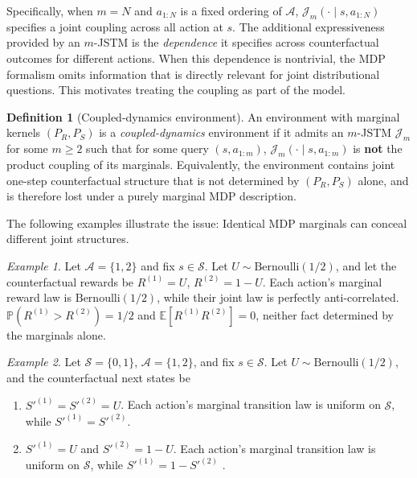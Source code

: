 \documentclass[accepted]{uai2026}
\theoremstyle{plain}
\theoremstyle{definition}
\newtheorem{definition}[theorem]{Definition}
\theoremstyle{remark}
\newtheorem{example}{Example}
\newcommand{\A}{\mathcal{A}}
\newcommand{\E}{\mathbb{E}}
\newcommand{\Ss}{\mathcal{S}}
\newcommand{\1}{\mathbbm{1}}
\begin{document}
Specifically, when $m =N$ and $a_{1:N}$ is a fixed ordering of $\A$, $\mathcal{J}_m(\cdot \mid s, a_{1:N})$ specifies a joint coupling across all action at $s$. The additional expressiveness provided by an $m$-JSTM is the \textit{dependence} it specifies across counterfactual outcomes for different actions. When this dependence is nontrivial, the MDP formalism omits information that is directly relevant for joint distributional questions. This motivates treating the coupling as part of the model.
\begin{definition}[Coupled-dynamics environment]
An environment with marginal kernels $(P_R, P_S)$ is a \textit{coupled-dynamics} environment if it admits an $m$-JSTM $\mathcal{J}_m$ for some $m \ge 2$ such that for some query $(s, a_{1:m})$, $\mathcal{J}_m(\cdot \mid s, a_{1:m})$ is \textbf{not} the product coupling of its marginals. Equivalently, the environment contains joint one-step counterfactual structure that is not determined by $(P_R, P_S)$ alone, and is therefore lost under a purely marginal MDP description.
\end{definition}

The following examples illustrate the issue: Identical MDP marginals can conceal different joint structures.
\begin{example}
Let $\A = \{1, 2\}$ and fix $s \in \Ss$. Let $U \sim \mathrm{Bernoulli}(1/2)$, and let the counterfactual rewards be $R^{(1)} = U$, $R^{(2)} = 1- U$. Each action's marginal reward law is $\mathrm{Bernoulli}(1/2)$, while their joint law is perfectly anti-correlated. $\mathbb{P}(R^{(1)} > R^{(2)}) = 1/2$ and $\E[R^{(1)}R^{(2)}]=0$, neither fact determined by the marginals alone.
\end{example}

\begin{example}
Let $\Ss = \{0, 1\}$, $\A = \{1, 2\}$, and fix $s \in \Ss$. Let $U \sim \mathrm{Bernoulli}(1/2)$, and the counterfactual next states be
\begin{enumerate}[leftmargin=*, itemsep=2pt,align=left]
\item[(2.1)] $S'^{(1)}= S'^{(2)} =U$. Each action's marginal transition law is uniform on $\Ss$, while $S'^{(1)}= S'^{(2)}$.
\item[(2.2)] $S'^{(1)} = U$ and $S'^{(2)}= 1-U$. Each action's marginal transition law is uniform on $\Ss$, while $S'^{(1)}=1- S'^{(2)}$ .
\end{enumerate}
\end{example}
\end{document}
